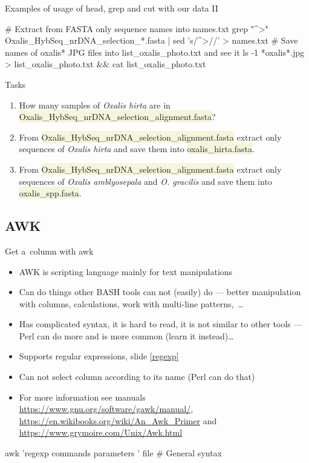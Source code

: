 \documentclass[compress, xelatex, 11pt, xcolor=svgnames, aspectratio=169,
	hyperref={
		bookmarks=true,
		unicode=true,
		colorlinks=true,
		pdftitle={Linux, command line and MetaCentrum},
		plainpages=false,
		pdfauthor={Vojtech Zeisek},
		pdfsubject={Course about use of Linux command line, writing shell scripts and using MetaCentrum of CESNET},
		pdfcreator={XeLaTeX},
		pdfkeywords={Linux, GNU, BASH, shell, command line, MetaCentrum},
		linkcolor=DarkRed, %
		anchorcolor=DarkBlue, %
		citecolor=Indigo, %
		filecolor=NavyBlue, %
		menucolor=DarkMagenta, %
		urlcolor=DarkBlue, %
		},
	url={hyphens, lowtilde} %
	]{beamer}
\renewcommand{\texttt}[1]{\colorbox{Beige}{{\ttfamily #1}}}
\begin{document}
\begin{frame}[fragile]{Examples of usage of head, grep and cut with our data II}
	\begin{bashcode}
    # Extract from FASTA only sequence names into names.txt
    grep "^>" Oxalis_HybSeq_nrDNA_selection_*.fasta | sed 's/^>//' > names.txt
    # Save names of oxalis* JPG files into list_oxalis_photo.txt and see it
    ls -1 *oxalis*.jpg > list_oxalis_photo.txt && cat list_oxalis_photo.txt
	\end{bashcode}
	\begin{block}{Tasks}
		\begin{enumerate}
			\item How many samples of \textit{Oxalis hirta} are in \texttt{Oxalis\_HybSeq\_nrDNA\_selection\_alignment.fasta}?
			\item From \texttt{Oxalis\_HybSeq\_nrDNA\_selection\_alignment.fasta} extract only sequences of \textit{Oxalis hirta} and save them into \texttt{oxalis\_hirta.fasta}.
			\item From \texttt{Oxalis\_HybSeq\_nrDNA\_selection\_alignment.fasta} extract only sequences of \textit{Oxalis amblyosepala} and \textit{O. gracilis} and save them into \texttt{oxalis\_spp.fasta}.
		\end{enumerate}
	\end{block}
\end{frame}

\subsection{AWK}

\begin{frame}[fragile]{Get a~column with awk}
	\begin{itemize}
		\item AWK is scripting language mainly for text manipulations
		\item Can do things other BASH tools can not (easily) do --- better manipulation with columns, calculations, work with multi-line patterns,~\ldots
		\item Has complicated syntax, it is hard to read, it is not similar to other tools --- Perl can do more and is more common (learn it instead)\ldots
		\item Supports regular expressions, slide \ref{regexp}
		\item Can not select column according to its name (Perl can do that)
		\item For more information see manuals \url{https://www.gnu.org/software/gawk/manual/}, \url{https://en.wikibooks.org/wiki/An_Awk_Primer} and \url{https://www.grymoire.com/Unix/Awk.html}
	\end{itemize}
	\vfill
	\begin{bashcode}
    awk 'regexp { commands parameters }' file # General syntax
	\end{bashcode}
\end{frame}
\end{document}
